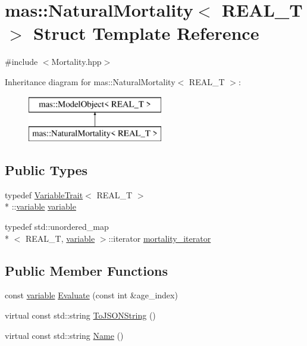 \hypertarget{structmas_1_1_natural_mortality}{\section{mas\-:\-:Natural\-Mortality$<$ R\-E\-A\-L\-\_\-\-T $>$ Struct Template Reference}
\label{structmas_1_1_natural_mortality}
}


{\ttfamily \#include $<$Mortality.\-hpp$>$}

Inheritance diagram for mas\-:\-:Natural\-Mortality$<$ R\-E\-A\-L\-\_\-\-T $>$\-:\begin{figure}[H]
\begin{center}
\leavevmode
\includegraphics[height=2.000000cm]{structmas_1_1_natural_mortality}
\end{center}
\end{figure}
\subsection*{Public Types}
\begin{DoxyCompactItemize}
\item 
typedef \hyperlink{structmas_1_1_variable_trait}{Variable\-Trait}$<$ R\-E\-A\-L\-\_\-\-T $>$\\*
\-::\hyperlink{structmas_1_1_natural_mortality_a6f9549336ac14a2e7c2f587af6b066da}{variable} \hyperlink{structmas_1_1_natural_mortality_a6f9549336ac14a2e7c2f587af6b066da}{variable}
\item 
typedef std\-::unordered\-\_\-map\\*
$<$ R\-E\-A\-L\-\_\-\-T, \hyperlink{structmas_1_1_natural_mortality_a6f9549336ac14a2e7c2f587af6b066da}{variable} $>$\-::iterator \hyperlink{structmas_1_1_natural_mortality_a8c522fde4eb83dd74a0046d6b29cf807}{mortality\-\_\-iterator}
\end{DoxyCompactItemize}
\subsection*{Public Member Functions}
\begin{DoxyCompactItemize}
\item 
const \hyperlink{structmas_1_1_natural_mortality_a6f9549336ac14a2e7c2f587af6b066da}{variable} \hyperlink{structmas_1_1_natural_mortality_ad01169fda1c37d1bdbd162e39c7d676a}{Evaluate} (const int \&age\-\_\-index)
\item 
virtual const std\-::string \hyperlink{structmas_1_1_natural_mortality_ae788facfc8178ed04eeb1d31caada8f3}{To\-J\-S\-O\-N\-String} ()
\item 
virtual const std\-::string \hyperlink{structmas_1_1_natural_mortality_a9dbf045654a42cc4ecbb3c35e70afda7}{Name} ()
\end{DoxyCompactItemize}
